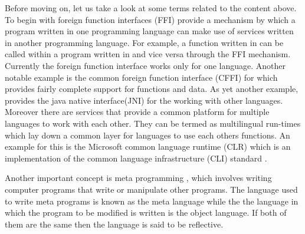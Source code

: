 \documentclass[thesis-solanki.tex]{subfiles}
\begin{document}
Before moving on, let us take a look at some terms related to the content above.
To begin with foreign function interfaces (FFI) \cite{website:ffiwiki} provide a mechanism by which a program written in
one programming language can make use of services written in another programming language. For example, a function
written in  can be called within a program written in  and vice versa through the FFI
mechanism.
Currently the  foreign function interface works only for one language.
Another notable example is the common foreign function interface (CFFI) \cite{website:commonlisp} for
 which provides fairly complete support for  functions and data.
As yet another example,  provides the java native interface(JNI) for the working with other
languages.
Moreover there are services that provide a common platform for multiple languages to work with each other.
They can be termed as multilingual run-times
which lay down a common layer for languages to use each others functions.
An example for this is the Microsoft common language runtime (CLR) \cite{website:clrwiki} which is an
implementation of the common language infrastructure (CLI) standard \cite{website:cliwiki}.

Another important concept is meta programming \cite{website:metaprogwiki}, which involves writing computer programs
that write or manipulate other programs.
The language used to write meta programs is known as the meta language while the the language in which the program
to be modified is written is the object language.
If both of them are the same then the language is said to be reflective.
\end{document}
